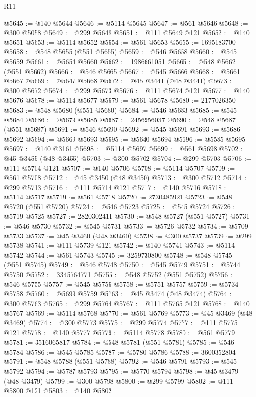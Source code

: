 \begin{lexlean}{R11}
\begin{coremodule}
{{{{{{{{{{{{{{{{{{{{{{{{{{{{{{{{{{{{{{{{{{{{{{{{{{{{{{{{{{{{{{{{{{{{{{{{{{{{{{{{{{@5645 := @140 @5644
@5646 := @5114 @5645
@5647 := @561 @5646
@5648 := @300 @5058
@5649 := @299 @5648
@5651 := @111 @5649 @121
@5652 := @140 @5651
@5653 := @5114 @5652
@5654 := @561 @5653
@5655 := 1695183700
@5658 := @548 @5655 (@551 @5655)
@5659 := @546 @5658
@5660 := @545 @5659
@5661 := @5654 @5660
@5662 := 1986661051
@5665 := @548 @5662 (@551 @5662)
@5666 := @546 @5665
@5667 := @545 @5666
@5668 := @5661 @5667
@5669 := @5647 @5668
@5672 := @45 @3441 (@48 @3441)
@5673 := @300 @5672
@5674 := @299 @5673
@5676 := @111 @5674 @121
@5677 := @140 @5676
@5678 := @5114 @5677
@5679 := @561 @5678
@5680 := 2177026350
@5683 := @548 @5680 (@551 @5680)
@5684 := @546 @5683
@5685 := @545 @5684
@5686 := @5679 @5685
@5687 := 2456956037
@5690 := @548 @5687 (@551 @5687)
@5691 := @546 @5690
@5692 := @545 @5691
@5693 := @5686 @5692
@5694 := @5669 @5693
@5695 := @5640 @5694
@5696 := @5585 @5695
@5697 := @140 @3161
@5698 := @5114 @5697
@5699 := @561 @5698
@5702 := @45 @3455 (@48 @3455)
@5703 := @300 @5702
@5704 := @299 @5703
@5706 := @111 @5704 @121
@5707 := @140 @5706
@5708 := @5114 @5707
@5709 := @561 @5708
@5712 := @45 @3450 (@48 @3450)
@5713 := @300 @5712
@5714 := @299 @5713
@5716 := @111 @5714 @121
@5717 := @140 @5716
@5718 := @5114 @5717
@5719 := @561 @5718
@5720 := 2730485921
@5723 := @548 @5720 (@551 @5720)
@5724 := @546 @5723
@5725 := @545 @5724
@5726 := @5719 @5725
@5727 := 2820302411
@5730 := @548 @5727 (@551 @5727)
@5731 := @546 @5730
@5732 := @545 @5731
@5733 := @5726 @5732
@5734 := @5709 @5733
@5737 := @45 @3460 (@48 @3460)
@5738 := @300 @5737
@5739 := @299 @5738
@5741 := @111 @5739 @121
@5742 := @140 @5741
@5743 := @5114 @5742
@5744 := @561 @5743
@5745 := 3259730800
@5748 := @548 @5745 (@551 @5745)
@5749 := @546 @5748
@5750 := @545 @5749
@5751 := @5744 @5750
@5752 := 3345764771
@5755 := @548 @5752 (@551 @5752)
@5756 := @546 @5755
@5757 := @545 @5756
@5758 := @5751 @5757
@5759 := @5734 @5758
@5760 := @5699 @5759
@5763 := @45 @3474 (@48 @3474)
@5764 := @300 @5763
@5765 := @299 @5764
@5767 := @111 @5765 @121
@5768 := @140 @5767
@5769 := @5114 @5768
@5770 := @561 @5769
@5773 := @45 @3469 (@48 @3469)
@5774 := @300 @5773
@5775 := @299 @5774
@5777 := @111 @5775 @121
@5778 := @140 @5777
@5779 := @5114 @5778
@5780 := @561 @5779
@5781 := 3516065817
@5784 := @548 @5781 (@551 @5781)
@5785 := @546 @5784
@5786 := @545 @5785
@5787 := @5780 @5786
@5788 := 3600352804
@5791 := @548 @5788 (@551 @5788)
@5792 := @546 @5791
@5793 := @545 @5792
@5794 := @5787 @5793
@5795 := @5770 @5794
@5798 := @45 @3479 (@48 @3479)
@5799 := @300 @5798
@5800 := @299 @5799
@5802 := @111 @5800 @121
@5803 := @140 @5802
}}}}}}}}}}}}}}}}}}}}}}}}}}}}}}}}}}}}}}}}}}}}}}}}}}}}}}}}}}}}}}}}}}}}}}}}}}}}}}}}}}
\end{coremodule}
\end{lexlean}
